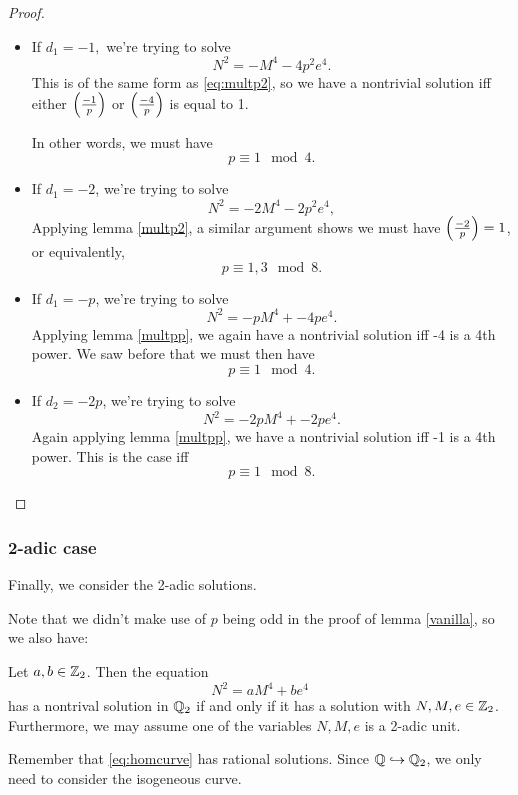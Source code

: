 \documentclass[12pt, a4paper]{amsart}
\begin{document}
\begin{proof}
\begin{itemize}
  \item If $d_1 = -1,$ we're trying to solve
    \[N^2 = -M^4 - 4p^2e^4.\]
    This is of the same form as \autoref{eq:multp2}, so we have a nontrivial
    solution iff either $\left(\frac{-1}{p}\right)$ or $\left(\frac{-4}{p}\right)$ is
    equal to 1.

    In other words, we must have
    \[p \equiv 1 \mod{4}.\]


  \item If $d_1 = -2$, we're trying to solve
    \[N^2 = -2M^4 - 2p^2e^4,\]
    Applying lemma \ref{multp2}, a similar argument shows
    we must have $\left(\frac{-2}{p}\right)=1$,
    or equivalently,
    \[p \equiv 1,3 \mod{8}.\]

  \item If $d_1 = -p$, we're trying to solve
    \[N^2 = -pM^4 + -4pe^4.\]
    Applying lemma \ref{multpp}, we again have a nontrivial solution
    iff -4 is a 4th power. We saw before that we must then have
    \[p \equiv 1 \mod{4}.\]

  \item If $d_2 = -2p$, we're trying to solve
    \[N^2 = -2pM^4 + -2pe^4.\]
    Again applying lemma \ref{multpp}, we have a nontrivial solution
    iff -1 is a 4th power. This is the case iff
    \[p \equiv 1 \mod{8}.\]
    
  \end{itemize} \qedhere
\end{proof}

\subsubsection{2-adic case}

Finally, we consider the 2-adic solutions.

Note that we didn't make use of $p$ being odd in the proof of lemma
\ref{vanilla}, so we also have:

\begin{lemma}
  Let $a, b \in {\mathbb Z}_2$. Then the equation
  \[N^2 = aM^4 + be^4\]
  has a nontrival solution in ${\mathbb Q}_2$ if and only if it has a solution
  with $N,M,e \in {\mathbb Z}_2$. Furthermore, we may assume one of the variables
  $N,M,e$ is a 2-adic unit.
\end{lemma}

Remember that \autoref{eq:homcurve} has
rational solutions. Since ${\mathbb Q} \hookrightarrow {\mathbb Q}_2$,
we only need to consider the isogeneous curve.
\end{document}

